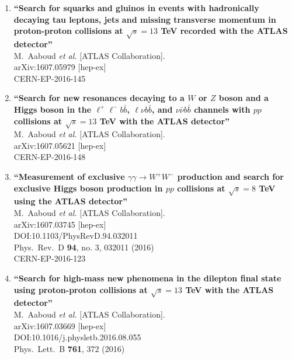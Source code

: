 \documentclass{article}
\begin{document}
\begin{enumerate}
\item%
{\bf ``Search for squarks and gluinos in events with hadronically decaying tau leptons, jets and missing transverse momentum in proton-proton collisions at $\sqrt{s}=13$ TeV recorded with the ATLAS detector''}
  \\{}M.~Aaboud {\it et al.} [ATLAS Collaboration].
  \\{}arXiv:1607.05979 [hep-ex]
  \\{}CERN-EP-2016-145
\item%
{\bf ``Search for new resonances decaying to a $W$ or $Z$ boson and a Higgs boson in the $\ell^+ \ell^- b\bar b$, $\ell \nu b\bar b$, and $\nu\bar{\nu} b\bar b$ channels with $pp$ collisions at $\sqrt s = 13$ TeV with the ATLAS detector''}
  \\{}M.~Aaboud {\it et al.} [ATLAS Collaboration].
  \\{}arXiv:1607.05621 [hep-ex]
  \\{}CERN-EP-2016-148
\item%
{\bf ``Measurement of exclusive $\gamma\gamma\rightarrow W^+W^-$ production and search for exclusive Higgs boson production in $pp$ collisions at $\sqrt{s} = 8$ TeV using the ATLAS detector''}
  \\{}M.~Aaboud {\it et al.} [ATLAS Collaboration].
  \\{}arXiv:1607.03745 [hep-ex]
  \\{}DOI:10.1103/PhysRevD.94.032011
  \\{}Phys.\ Rev.\ D {\bf 94}, no. 3, 032011 (2016)
  \\{}CERN-EP-2016-123
\item%
{\bf ``Search for high-mass new phenomena in the dilepton final state using proton-proton collisions at $\sqrt{s}=13$ TeV with the ATLAS detector''}
  \\{}M.~Aaboud {\it et al.} [ATLAS Collaboration].
  \\{}arXiv:1607.03669 [hep-ex]
  \\{}DOI:10.1016/j.physletb.2016.08.055
  \\{}Phys.\ Lett.\ B {\bf 761}, 372 (2016)

\end{enumerate}
\end{document}
